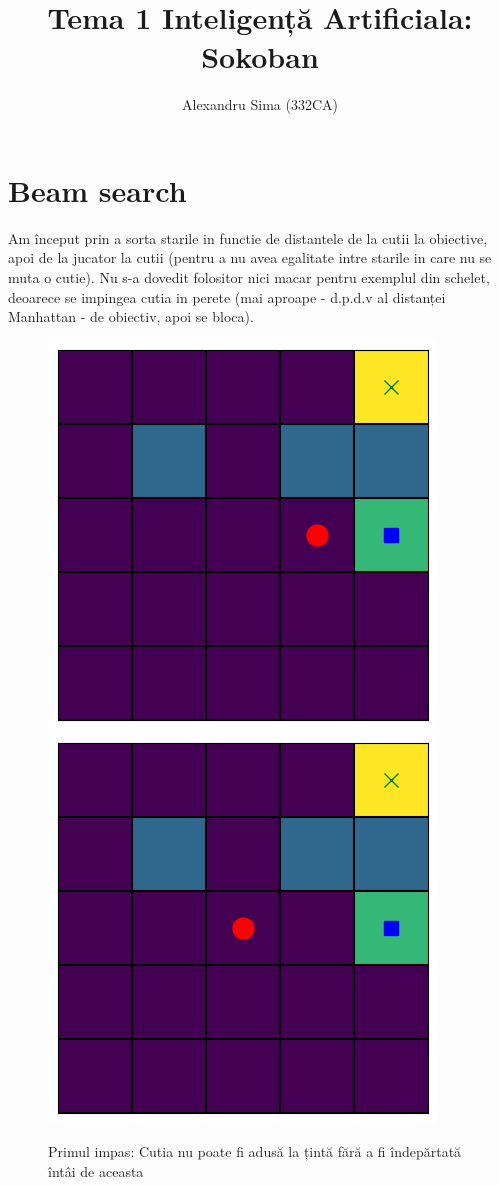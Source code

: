 \documentclass{article}
\title{Tema 1 Inteligență Artificiala: Sokoban}
\author{Alexandru Sima (332CA)}
\begin{document}
\maketitle
\tableofcontents

\section{Beam search}

Am început prin a sorta starile in functie de distantele de la cutii la 
obiective, apoi de la jucator la cutii (pentru a nu avea egalitate intre starile
in care nu se muta o cutie). Nu s-a dovedit folositor nici macar pentru exemplul
din schelet, deoarece se impingea cutia in perete (mai aproape - d.p.d.v al 
distanței Manhattan - de obiectiv, apoi se bloca).
\begin{figure}[ht]
    \includegraphics[scale=0.4]{a}
    \includegraphics[scale=0.4]{b}
    \caption{Primul impas: Cutia nu poate fi adusă la țintă fără a fi 
    îndepărtată întâi de aceasta}
\end{figure}
\end{document}
